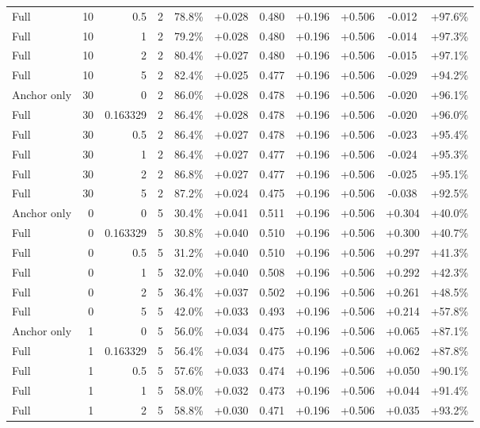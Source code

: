 \begin{table}[htbp]
\begin{tabular}{lrrrccccccc}
Full & 10 & 0.5 & 2 & 78.8\% & +0.028 & 0.480 & +0.196 & +0.506 & -0.012 & +97.6\% \\
Full & 10 & 1 & 2 & 79.2\% & +0.028 & 0.480 & +0.196 & +0.506 & -0.014 & +97.3\% \\
Full & 10 & 2 & 2 & 80.4\% & +0.027 & 0.480 & +0.196 & +0.506 & -0.015 & +97.1\% \\
Full & 10 & 5 & 2 & 82.4\% & +0.025 & 0.477 & +0.196 & +0.506 & -0.029 & +94.2\% \\
Anchor only & 30 & 0 & 2 & 86.0\% & +0.028 & 0.478 & +0.196 & +0.506 & -0.020 & +96.1\% \\
Full & 30 & 0.163329 & 2 & 86.4\% & +0.028 & 0.478 & +0.196 & +0.506 & -0.020 & +96.0\% \\
Full & 30 & 0.5 & 2 & 86.4\% & +0.027 & 0.478 & +0.196 & +0.506 & -0.023 & +95.4\% \\
Full & 30 & 1 & 2 & 86.4\% & +0.027 & 0.477 & +0.196 & +0.506 & -0.024 & +95.3\% \\
Full & 30 & 2 & 2 & 86.8\% & +0.027 & 0.477 & +0.196 & +0.506 & -0.025 & +95.1\% \\
Full & 30 & 5 & 2 & 87.2\% & +0.024 & 0.475 & +0.196 & +0.506 & -0.038 & +92.5\% \\
Anchor only & 0 & 0 & 5 & 30.4\% & +0.041 & 0.511 & +0.196 & +0.506 & +0.304 & +40.0\% \\
Full & 0 & 0.163329 & 5 & 30.8\% & +0.040 & 0.510 & +0.196 & +0.506 & +0.300 & +40.7\% \\
Full & 0 & 0.5 & 5 & 31.2\% & +0.040 & 0.510 & +0.196 & +0.506 & +0.297 & +41.3\% \\
Full & 0 & 1 & 5 & 32.0\% & +0.040 & 0.508 & +0.196 & +0.506 & +0.292 & +42.3\% \\
Full & 0 & 2 & 5 & 36.4\% & +0.037 & 0.502 & +0.196 & +0.506 & +0.261 & +48.5\% \\
Full & 0 & 5 & 5 & 42.0\% & +0.033 & 0.493 & +0.196 & +0.506 & +0.214 & +57.8\% \\
Anchor only & 1 & 0 & 5 & 56.0\% & +0.034 & 0.475 & +0.196 & +0.506 & +0.065 & +87.1\% \\
Full & 1 & 0.163329 & 5 & 56.4\% & +0.034 & 0.475 & +0.196 & +0.506 & +0.062 & +87.8\% \\
Full & 1 & 0.5 & 5 & 57.6\% & +0.033 & 0.474 & +0.196 & +0.506 & +0.050 & +90.1\% \\
Full & 1 & 1 & 5 & 58.0\% & +0.032 & 0.473 & +0.196 & +0.506 & +0.044 & +91.4\% \\
Full & 1 & 2 & 5 & 58.8\% & +0.030 & 0.471 & +0.196 & +0.506 & +0.035 & +93.2\% \\

\end{tabular}
\end{table}
